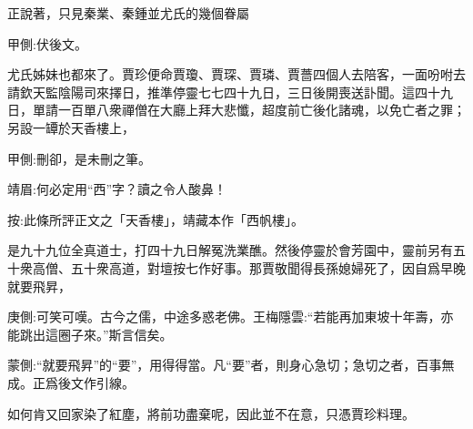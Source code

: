 \begin{parag}
    正說著，只見秦業、秦鍾並尤氏的幾個眷屬\begin{note}甲側:伏後文。\end{note}尤氏姊妹也都來了。賈珍便命賈瓊、賈琛、賈璘、賈薔四個人去陪客，一面吩咐去請欽天監陰陽司來擇日，推準停靈七七四十九日，三日後開喪送訃聞。這四十九日，單請一百單八衆禪僧在大廳上拜大悲懺，超度前亡後化諸魂，以免亡者之罪；另設一罈於天香樓上，\begin{note}甲側:刪卻，是未刪之筆。\end{note}\begin{note}靖眉:何必定用“西”字？讀之令人酸鼻！\end{note}\begin{subnote}按:此條所評正文之「天香樓」，靖藏本作「西帆樓」。\end{subnote}是九十九位全真道士，打四十九日解冤洗業醮。然後停靈於會芳園中，靈前另有五十衆高僧、五十衆高道，對壇按七作好事。那賈敬聞得長孫媳婦死了，因自爲早晚就要飛昇，\begin{note}庚側:可笑可嘆。古今之儒，中途多惑老佛。王梅隱雲:“若能再加東坡十年壽，亦能跳出這圈子來。”斯言信矣。\end{note}\begin{note}蒙側:“就要飛昇”的“要”，用得得當。凡“要”者，則身心急切；急切之者，百事無成。正爲後文作引線。\end{note}如何肯又回家染了紅塵，將前功盡棄呢，因此並不在意，只憑賈珍料理。
\end{parag}


